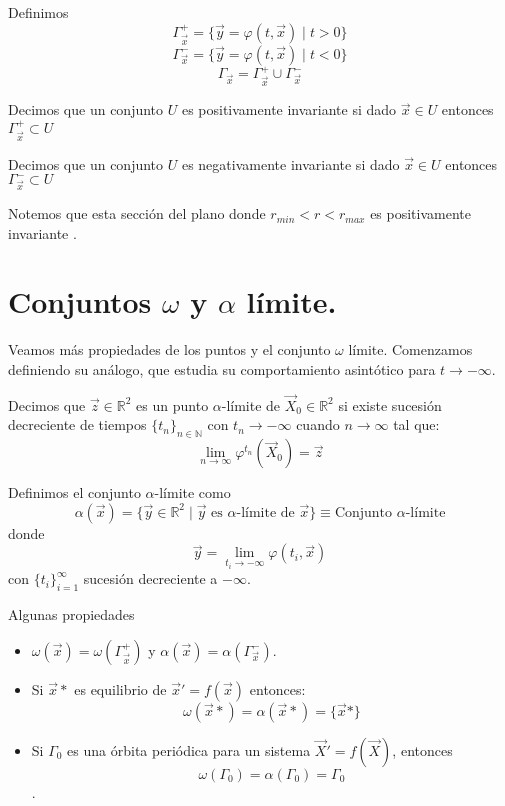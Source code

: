 \newpage

\begin{definition}
	Definimos
	$$\varGamma_{\vec{x}}^{+}=\{\vec{y}=\varphi(t,\vec{x})\mid t>0\}$$
	$$\varGamma_{\vec{x}}^{-}=\{\vec{y}=\varphi(t,\vec{x})\mid t<0\}$$
	$$\varGamma_{\vec{x}}=\varGamma_{\vec{x}}^{+}\cup\varGamma_{\vec{x}}^{-}$$
\end{definition}

\begin{definition}
	Decimos que un conjunto $U$ es positivamente invariante si dado $\vec{x}\in U$ entonces  $\varGamma_{\vec{x}}^{+}\subset U$
\end{definition}

\begin{definition}
	Decimos que un conjunto $U$ es negativamente invariante si dado $\vec{x}\in U$ entonces  $\varGamma_{\vec{x}}^{-}\subset U$
\end{definition}

Notemos que esta sección del plano donde $r_{min}<r<r_{max}$ es positivamente invariante \cite{hirsch2012differential}.
\newpage
\section{Conjuntos $\omega$ y $\alpha$ límite.}

Veamos más propiedades de los puntos y el conjunto $\omega$ límite. Comenzamos definiendo su análogo,
que estudia su comportamiento asintótico para $t\to-\infty$.\\

\begin{definition}
	Decimos que $\vec{z}\in\mathbb{R}^2$ es un punto $\alpha$-límite
	de $\vec{X}_0\in\mathbb{R}^2$ si existe sucesión decreciente de
	tiempos $\{t_n\}_{n\in\mathbb{N}}$
	con $t_n \to-\infty$ cuando $n\to \infty$ tal que:
	$$\lim_{n\to\infty}\varphi^{t_n}(\vec{X}_0)=\vec{z}$$
\end{definition}

\begin{definition}
	Definimos el conjunto $\alpha$-límite como $$\alpha(\vec{x})=\{\vec{y}\in\mathbb{R}^2\mid\vec{y}
		\text{ es } \alpha\text{-límite de }\vec{x}\}\equiv\text{Conjunto }\alpha\text{-límite}$$
	donde
	$$\vec{y}=\lim_{t_i\to-\infty}\varphi(t_i,\vec{x})$$
	con $\{t_i\}_{i=1}^{\infty}$ sucesión decreciente a $-\infty$.
\end{definition}

Algunas propiedades
\begin{itemize}
	\item $\omega(\vec{x})=\omega(\varGamma_{\vec{x}}^{+})$
	      y $\alpha(\vec{x})=\alpha(\varGamma_{\vec{x}}^{-})$.\\
	\item Si $\vec{x}*$ es equilibrio de $\vec{x}'=f(\vec{x})$ entonces:
	      $$\omega(\vec{x}*)=\alpha(\vec{x}*)=\{\vec{x}*\}$$
	\item Si $\varGamma_0$ es una órbita periódica para un sistema $\vec{X}'=f(\vec{X})$, entonces
	      $$\omega(\varGamma_0)=\alpha(\varGamma_0)=\varGamma_0$$.
\end{itemize}

